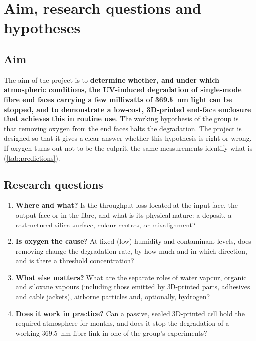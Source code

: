 \section{Aim, research questions and hypotheses}\label{sec:aims}

\subsection{Aim}
The aim of the project is to \textbf{determine whether, and under which atmospheric conditions, the
UV-induced degradation of single-mode fibre end faces carrying a few milliwatts of \SI{369.5}{nm}
light can be stopped, and to demonstrate a low-cost, 3D-printed end-face enclosure that achieves this
in routine use}. The working hypothesis of the group is that removing oxygen from the end faces halts
the degradation. The project is designed so that it gives a clear answer whether this
hypothesis is right or wrong. If oxygen turns out not to be the culprit, the same
measurements identify what is (\cref{tab:predictions}).

\subsection{Research questions}
\begin{enumerate}[label=\textbf{RQ\arabic*},leftmargin=3.2em]
  \item \textbf{Where and what?} Is the throughput loss located at the input face, the output face or in
        the fibre, and what is its physical nature: a deposit, a restructured silica surface, colour
        centres, or misalignment?
  \item \textbf{Is oxygen the cause?} At fixed (low) humidity and contaminant levels, does removing
        \Oxy{} change the degradation rate, by how much and in which direction, and is there a threshold
        \Oxy{} concentration?
  \item \textbf{What else matters?} What are the separate roles of water vapour, organic and siloxane
        vapours (including those emitted by 3D-printed parts, adhesives and cable jackets), airborne
        particles and, optionally, hydrogen?
  \item \textbf{Does it work in practice?} Can a passive, sealed 3D-printed cell hold the required
        atmosphere for months, and does it stop the degradation of a working \SI{369.5}{nm} fibre link in
        one of the group's experiments?
\end{enumerate}

